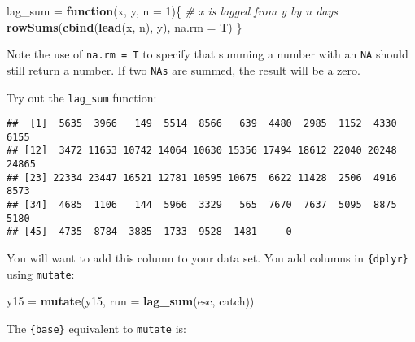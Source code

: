 \documentclass[]{book}
\newenvironment{Shaded}{\begin{snugshade}}{\end{snugshade}}
\newcommand{\KeywordTok}[1]{\textcolor[rgb]{0.13,0.29,0.53}{\textbf{#1}}}
\newcommand{\DataTypeTok}[1]{\textcolor[rgb]{0.13,0.29,0.53}{#1}}
\newcommand{\DecValTok}[1]{\textcolor[rgb]{0.00,0.00,0.81}{#1}}
\newcommand{\StringTok}[1]{\textcolor[rgb]{0.31,0.60,0.02}{#1}}
\newcommand{\CommentTok}[1]{\textcolor[rgb]{0.56,0.35,0.01}{\textit{#1}}}
\newcommand{\ControlFlowTok}[1]{\textcolor[rgb]{0.13,0.29,0.53}{\textbf{#1}}}
\newcommand{\OperatorTok}[1]{\textcolor[rgb]{0.81,0.36,0.00}{\textbf{#1}}}
\newcommand{\NormalTok}[1]{#1}
\theoremstyle{definition}
\theoremstyle{definition}
\theoremstyle{definition}
\theoremstyle{remark}
\begin{document}
\begin{Shaded}
\begin{Highlighting}[]
\NormalTok{lag_sum =}\StringTok{ }\ControlFlowTok{function}\NormalTok{(x, y, }\DataTypeTok{n =} \DecValTok{1}\NormalTok{)\{}
  \CommentTok{# x is lagged from y by n days}
  \KeywordTok{rowSums}\NormalTok{(}\KeywordTok{cbind}\NormalTok{(}\KeywordTok{lead}\NormalTok{(x, n), y), }\DataTypeTok{na.rm =}\NormalTok{ T)}
\NormalTok{\}}
\end{Highlighting}
\end{Shaded}

Note the use of \texttt{na.rm\ =\ T} to specify that summing a number
with an \texttt{NA} should still return a number. If two \texttt{NAs}
are summed, the result will be a zero.

Try out the \texttt{lag\_sum} function:

\begin{Shaded}
\end{Shaded}

\begin{verbatim}
##  [1]  5635  3966   149  5514  8566   639  4480  2985  1152  4330  6155
## [12]  3472 11653 10742 14064 10630 15356 17494 18612 22040 20248 24865
## [23] 22334 23447 16521 12781 10595 10675  6622 11428  2506  4916  8573
## [34]  4685  1106   144  5966  3329   565  7670  7637  5095  8875  5180
## [45]  4735  8784  3885  1733  9528  1481     0
\end{verbatim}

You will want to add this column to your data set. You add columns in
\texttt{\{dplyr\}} using \texttt{mutate}:

\begin{Shaded}
\begin{Highlighting}[]
\NormalTok{y15 =}\StringTok{ }\KeywordTok{mutate}\NormalTok{(y15, }\DataTypeTok{run =} \KeywordTok{lag_sum}\NormalTok{(esc, catch))}
\end{Highlighting}
\end{Shaded}

The \texttt{\{base\}} equivalent to \texttt{mutate} is:

\begin{Shaded}
\end{Shaded}
\end{document}
